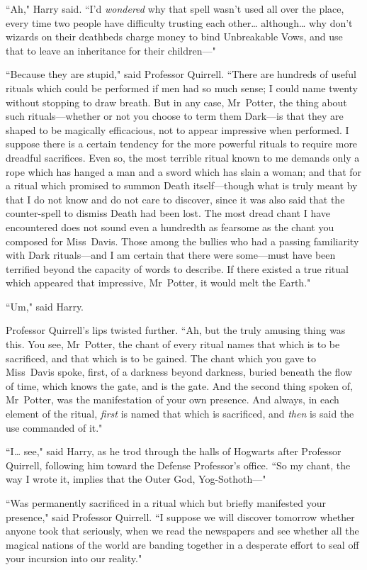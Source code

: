 ``Ah," Harry said. ``I'd \emph{wondered} why that spell wasn't used all over the place, every time two people have difficulty trusting each other{\ldots} although{\ldots} why don't wizards on their deathbeds charge money to bind Unbreakable Vows, and use that to leave an inheritance for their children—"

``Because they are stupid," said Professor Quirrell. ``There are hundreds of useful rituals which could be performed if men had so much sense; I could name twenty without stopping to draw breath. But in any case, Mr~Potter, the thing about such rituals—whether or not you choose to term them Dark—is that they are shaped to be magically efficacious, not to appear impressive when performed. I suppose there is a certain tendency for the more powerful rituals to require more dreadful sacrifices. Even so, the most terrible ritual known to me demands only a rope which has hanged a man and a sword which has slain a woman; and that for a ritual which promised to summon Death itself—though what is truly meant by that I do not know and do not care to discover, since it was also said that the counter-spell to dismiss Death had been lost. The most dread chant I have encountered does not sound even a hundredth as fearsome as the chant you composed for Miss~Davis. Those among the bullies who had a passing familiarity with Dark rituals—and I am certain that there were some—must have been terrified beyond the capacity of words to describe. If there existed a true ritual which appeared that impressive, Mr~Potter, it would melt the Earth."

``Um," said Harry.

Professor Quirrell's lips twisted further. ``Ah, but the truly amusing thing was this. You see, Mr~Potter, the chant of every ritual names that which is to be sacrificed, and that which is to be gained. The chant which you gave to Miss~Davis spoke, first, of a darkness beyond darkness, buried beneath the flow of time, which knows the gate, and is the gate. And the second thing spoken of, Mr~Potter, was the manifestation of your own presence. And always, in each element of the ritual, \emph{first} is named that which is sacrificed, and \emph{then} is said the use commanded of it."

``I{\ldots} see," said Harry, as he trod through the halls of Hogwarts after Professor Quirrell, following him toward the Defense Professor's office. ``So my chant, the way I wrote it, implies that the Outer God, Yog-Sothoth—"

``Was permanently sacrificed in a ritual which but briefly manifested your presence," said Professor Quirrell. ``I suppose we will discover tomorrow whether anyone took that seriously, when we read the newspapers and see whether all the magical nations of the world are banding together in a desperate effort to seal off your incursion into our reality."

